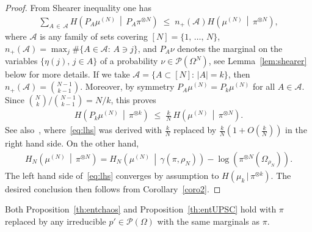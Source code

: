 \documentclass[AHL,Unicode,longabstracts,published]{cedram}
\renewcommand{\leq}{\;\leqslant\;}
\newcommand{\tc}{\, |\, }
\newcommand{\cA}{\mathcal{A}}
\newcommand{\cP}{\mathcal{P}}
\let\g=\gamma
\let\r=\rho
\let\O=\Omega
\begin{document}
\begin{proof}
From Shearer inequality one has
\begin{align}
\sum_{A\,\in\,\cA}H\left(P_A\mu^{(N)}\,\middle|\,P_A\pi^{\otimes N}\right) \leq n_+(\cA)H\left(\mu^{(N)}\,\middle|\, \pi^{\otimes N}\right),
\end{align}
where $\cA$ is any family of sets covering $[N]=\{1,\,\dots,\,N\}$, $n_+(\cA) = \max_{j} \#\{A\in\cA:\,A\ni j\}$, and $P_A\nu$ denotes the marginal on the variables $\{\eta(j),\,j\in A\}$ of a probability $\nu\in\cP(\O^N)$, see Lemma~\ref{lem:shearer} below for more details. If we take $\cA=\{A\subset [N]:\,|A|=k\}$, then $n_+(\cA) =\binom{N-1}{k-1}$. Moreover, by symmetry $P_A\mu^{(N)}=P_k\mu^{(N)}$ for all $A\in\cA$. Since $\binom{N}{k}/\binom{N-1}{k-1}=N/k$, this proves
\begin{align}\label{eq:lhs}
H\left(P_k\mu^{(N)}\,\middle|\, \pi^{\otimes k}\right) \leq \frac{k}N\,H\left(\mu^{(N)}\,\middle|\, \pi^{\otimes N}\right).
\end{align}
See also~\cite[Lemma~3.9]{miclo}, where~\eqref{eq:lhs} was derived with $\frac{k}{N}$ replaced by $\frac{k}{N}(1+O(\frac{k}{N}))$ in the right hand side. On the other hand,
\begin{align}\label{eq:entchaos4}
H_N\left(\mu^{(N)}\,\middle|\, \pi^{\otimes N}\right) = H_N\left(\mu^{(N)}\,\middle|\, \g(\pi,\r_N)\right) - \log\left(\pi^{\otimes N}(\O_{\r_N})\right).
\end{align}
The left hand side of~\eqref{eq:lhs} converges by assumption to $H\left(\mu_k\tc\pi^{\otimes k}\right)$. The desired conclusion then follows from Corollary~\ref{coro2}.
\end{proof}

\begin{rema}\label{rem:anyp}
Both Proposition~\ref{th:entchaos} and Proposition~\ref{th:entUPSC} hold with $\pi$ replaced by any irreducible $p'\in\cP(\O)$ with the same marginals as $\pi$.
\end{rema}
\end{document}
